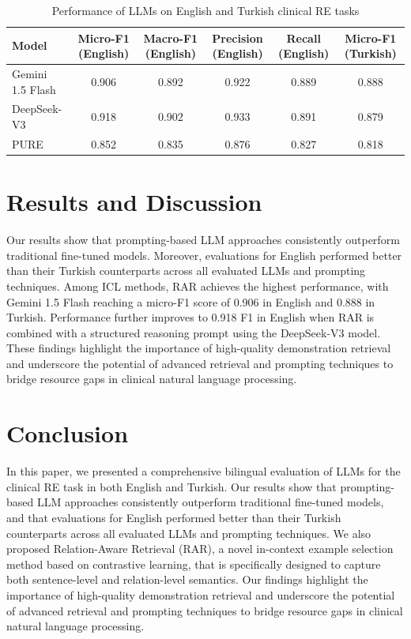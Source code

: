 \documentclass{article}
\begin{document}
\begin{table}[h]
\centering
\begin{tabular}{|l|c|c|c|c|c|}
\hline
\textbf{Model} & \textbf{Micro-F1 (English)} & \textbf{Macro-F1 (English)} & \textbf{Precision (English)} & \textbf{Recall (English)} & \textbf{Micro-F1 (Turkish)} \\ \hline
Gemini 1.5 Flash & 0.906 & 0.892 & 0.922 & 0.889 & 0.888 \\ \hline
DeepSeek-V3 & 0.918 & 0.902 & 0.933 & 0.891 & 0.879 \\ \hline
PURE & 0.852 & 0.835 & 0.876 & 0.827 & 0.818 \\ \hline
\end{tabular}
\caption{Performance of LLMs on English and Turkish clinical RE tasks}
\label{tab:performance}
\end{table}

\section{Results and Discussion}
Our results show that prompting-based LLM approaches consistently outperform traditional fine-tuned models. Moreover, evaluations for English performed better than their Turkish counterparts across all evaluated LLMs and prompting techniques. Among ICL methods, RAR achieves the highest performance, with Gemini 1.5 Flash reaching a micro-F1 score of 0.906 in English and 0.888 in Turkish. Performance further improves to 0.918 F1 in English when RAR is combined with a structured reasoning prompt using the DeepSeek-V3 model. These findings highlight the importance of high-quality demonstration retrieval and underscore the potential of advanced retrieval and prompting techniques to bridge resource gaps in clinical natural language processing.

\section{Conclusion}
In this paper, we presented a comprehensive bilingual evaluation of LLMs for the clinical RE task in both English and Turkish. Our results show that prompting-based LLM approaches consistently outperform traditional fine-tuned models, and that evaluations for English performed better than their Turkish counterparts across all evaluated LLMs and prompting techniques. We also proposed Relation-Aware Retrieval (RAR), a novel in-context example selection method based on contrastive learning, that is specifically designed to capture both sentence-level and relation-level semantics. Our findings highlight the importance of high-quality demonstration retrieval and underscore the potential of advanced retrieval and prompting techniques to bridge resource gaps in clinical natural language processing.
\end{document}
